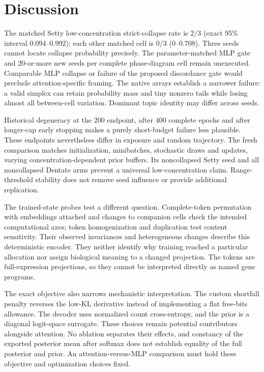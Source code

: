 \section{Discussion}
The matched Setty low-concentration strict-collapse rate is $2/3$ (exact 95\% interval 0.094--0.992); each other matched cell is $0/3$ (0--0.708). Three seeds cannot locate collapse probability precisely. The parameter-matched MLP gate and 20-or-more new seeds per complete phase-diagram cell remain unexecuted. Comparable MLP collapse or failure of the proposed discordance gate would preclude attention-specific framing. The native arrays establish a narrower failure: a valid simplex can retain probability mass and tiny nonzero tails while losing almost all between-cell variation. Dominant topic identity may differ across seeds.

Historical degeneracy at the 200 endpoint, after 400 complete epochs and after longer-cap early stopping makes a purely short-budget failure less plausible. These endpoints nevertheless differ in exposure and random trajectory. The fresh comparison matches initialization, minibatches, stochastic draws and updates, varying concentration-dependent prior buffers. Its noncollapsed Setty seed and all noncollapsed Dentate arms prevent a universal low-concentration claim. Range-threshold stability does not remove seed influence or provide additional replication.

The trained-state probes test a different question. Complete-token permutation with embeddings attached and changes to companion cells check the intended computational axes; token homogenization and duplication test content sensitivity. Their observed invariances and heterogeneous changes describe this deterministic encoder. They neither identify why training reached a particular allocation nor assign biological meaning to a changed projection. The tokens are full-expression projections, so they cannot be interpreted directly as named gene programs.

The exact objective also narrows mechanistic interpretation. The custom shortfall penalty reverses the low-KL derivative instead of implementing a flat free-bits allowance. The decoder uses normalized count cross-entropy, and the prior is a diagonal logit-space surrogate. These choices remain potential contributors alongside attention. No ablation separates their effects, and constancy of the exported posterior mean after softmax does not establish equality of the full posterior and prior. An attention-versus-MLP comparison must hold these objective and optimization choices fixed.

